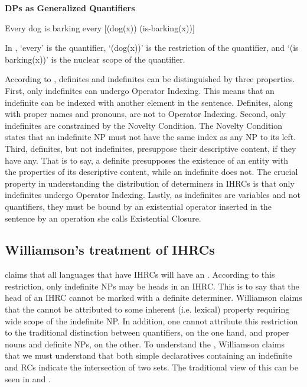 \documentclass[output=paper]{LSP/langsci}
\begin{document}
\ea \textbf{DPs as Generalized Quantifiers}
\begin{xlist}
\ex Every dog is barking \label{boyle39a}
\ex every [(dog(x)) (is-barking(x))] \label{boyle39b}
\end{xlist}
\z

In , `every' is the quantifier, `(dog(x))' is the restriction of the quantifier, and `(is barking(x))' is the nuclear scope of the quantifier.  

According to \citet{Heim1982}, definites and indefinites can be distinguished by three properties. First, only indefinites can undergo Operator Indexing. This means that an indefinite can be indexed with another element in the sentence. Definites, along with proper names and pronouns, are not  to Operator Indexing. Second, only indefinites are constrained by the Novelty Condition. The Novelty Condition states that an indefinite NP must not have the same index as any NP to its left. Third, definites, but not indefinites, presuppose their descriptive content, if they have any.  That is to say, a definite presupposes the existence of an entity with the properties of its descriptive content, while an indefinite does not. The crucial property in understanding the distribution of determiners in IHRCs is that only indefinites undergo Operator Indexing. Lastly, as indefinites are variables and not quantifiers, they must be bound by an existential operator inserted in the sentence by an operation she calls Existential Closure.

\subsection{Williamson's treatment of IHRCs}\label{sec:boyle:6.2}

\citet{Williamson1987} claims that all languages that have IHRCs will have an . According to this restriction, only indefinite NPs may be heads in an IHRC. This is to say that the head of an IHRC cannot be marked with a definite determiner. Williamson claims that the  cannot be attributed to some inherent (i.e. lexical) property requiring wide scope of the indefinite NP. In addition, one cannot attribute this restriction to the traditional distinction between quantifiers, on the one hand, and proper nouns and definite NPs, on the other. To understand the , Williamson claims that we must understand that both simple declaratives containing an indefinite and RCs indicate the intersection of two sets. The traditional view of this can be seen in  and .
\end{document}
